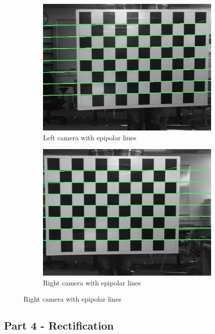 \documentclass[12pt,a4paper,final]{article}
\begin{document}
\begin{figure}[H]
\centering
\begin{subfigure}{.5\textwidth}
  \centering
  \includegraphics[width=.9\linewidth]{leftEpi}
  \caption{Left camera with epipolar lines}
  \label{fig:sub1}
\end{subfigure}%
\begin{subfigure}{.5\textwidth}
  \centering
  \includegraphics[width=.9\linewidth]{rightEpi}
  \caption{Right camera with epipolar lines}
  \label{fig:sub2}
\end{subfigure}
\label{fig:test}
\end{figure}

\subsection*{Part 4 - Rectification}
\end{document}

